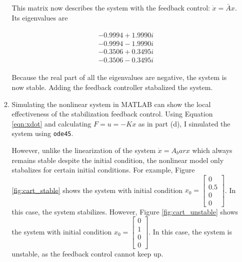 \documentclass[11pt]{article}
\theoremstyle{definition}
\begin{document}
\begin{enumerate}
\begin{enumerate}
        This matrix now describes the system with the feedback control: $\dot{x} = \bar{A}x$.  Its eigenvalues are

        \begin{align*}
            \begin{matrix}
              -0.9994 + 1.9990i \\
              -0.9994 - 1.9990i \\
              -0.3506 + 0.3495i \\
              -0.3506 - 0.3495i
            \end{matrix}
        \end{align*}

        Because the real part of all the eigenvalues are negative, the system is now stable.  Adding the feedback controller stabalized the system.

        \item %
        Simulating the nonlinear system in MATLAB can show the local effectiveness of the stabilization feedback control.  Using Equation \ref{eqn:xdot} and calculating $F = u = -Kx$ as in part (d), I simulated the system using \texttt{ode45}.

        However, unlike the linearization of the system $\dot{x} = A_bar x$ which always remains stable despite the initial condition, the nonlinear model only stabalizes for certain initial conditions.  For example, Figure \ref{fig:cart_stable} shows the system with initial condition $x_0 = \begin{bmatrix} 0 \\ 0.5 \\ 0 \\ 0 \end{bmatrix}$.  In this case, the system stabilizes.  However, Figure \ref{fig:cart_unstable} shows the system with initial condition $x_0 = \begin{bmatrix} 0 \\ 1 \\ 0 \\ 0 \end{bmatrix}$.  In this case, the system is unstable, as the feedback control cannot keep up.


\end{enumerate}
\end{enumerate}
\end{document}

